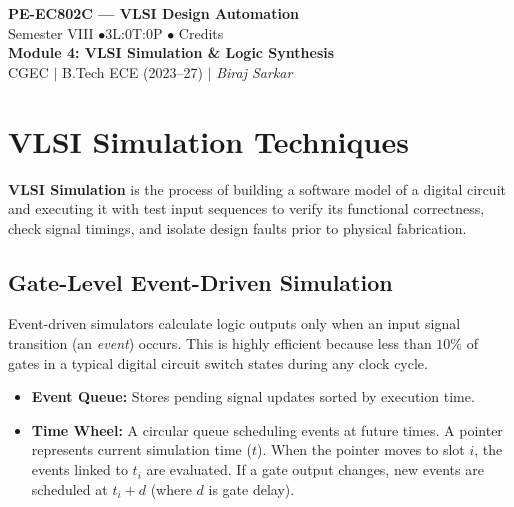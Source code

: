 \documentclass[12pt,a4paper]{article}
\begin{document}

\begin{center}
  {\LARGE\bfseries\color{myred} PE-EC802C --- VLSI Design Automation}\\[5pt]
  {\normalsize\color{mydark} Semester VIII \quad$\bullet$\quad 3L:0T:0P \quad$\bullet$ Credits}\\[3pt]
  {\normalsize\color{myteal}\textbf{Module 4: VLSI Simulation \& Logic Synthesis}}\\[3pt]
  {\small\color{mydark} CGEC \;$|$\; B.Tech ECE (2023--27) \;$|$\; \textit{Biraj Sarkar}}
\end{center}
\vspace{2pt}
\noindent{\color{myred}\rule{\linewidth}{1.5pt}}
\vspace{2pt}

\hypersetup{linkcolor=mydark}
\tableofcontents
\hypersetup{linkcolor=myteal}
\newpage

\section{VLSI Simulation Techniques}

\begin{tcolorbox}[defbox, title={VLSI Simulation}]
  \textbf{VLSI Simulation} is the process of building a software model of a digital circuit and executing it with test input sequences to verify its functional correctness, check signal timings, and isolate design faults prior to physical fabrication.
\end{tcolorbox}

\subsection{Gate-Level Event-Driven Simulation}
Event-driven simulators calculate logic outputs only when an input signal transition (an \textit{event}) occurs. This is highly efficient because less than $10\%$ of gates in a typical digital circuit switch states during any clock cycle.
\begin{itemize}[leftmargin=*, itemsep=2pt]
  \item \textbf{Event Queue:} Stores pending signal updates sorted by execution time.
  \item \textbf{Time Wheel:} A circular queue scheduling events at future times. A pointer represents current simulation time ($t$). When the pointer moves to slot $i$, the events linked to $t_i$ are evaluated. If a gate output changes, new events are scheduled at $t_i + d$ (where $d$ is gate delay).
\end{itemize}
\end{document}
